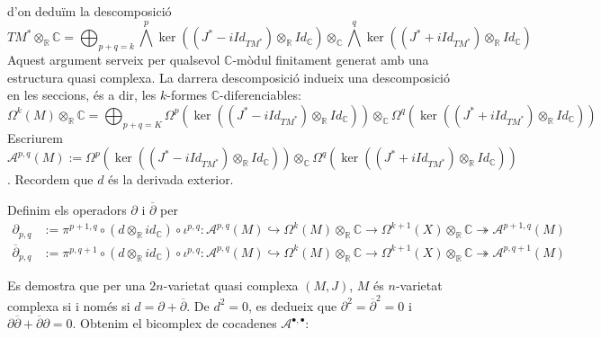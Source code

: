 d'on deduïm la descomposició
\begin{equation*}
    TM^{*}\otimes_{\mathbb{R}}\mathbb{C}
    =\bigoplus_{p+q=k}\bigwedge^{p}\ker((J^{*}-iId_{TM^{*}})\otimes_{\mathbb{R}}Id_{\mathbb{C}})\otimes_{\mathbb{C}}\bigwedge^{q}\ker((J^{*}+iId_{TM^{*}})\otimes_{\mathbb{R}}Id_{\mathbb{C}})
\end{equation*}
Aquest argument serveix per qualsevol $\mathbb{C}$-mòdul finitament generat amb una estructura quasi complexa. La darrera descomposició indueix una descomposició en les seccions, és a dir, les $k$-formes $\mathbb{C}$-diferenciables:
\begin{equation*}
    \Omega^{k}(M)\otimes_{\mathbb{R}}\mathbb{C}
    =\bigoplus_{p+q=K}\Omega^{p}(\ker((J^{*}-iId_{TM^{*}})\otimes_{\mathbb{R}}Id_{\mathbb{C}}))\otimes_{\mathbb{C}}\Omega^{q}(\ker((J^{*}+iId_{TM^{*}})\otimes_{\mathbb{R}}Id_{\mathbb{C}}))
\end{equation*}
Escriurem $\mathcal{A}^{p,q}(M):=\Omega^{p}(\ker((J^{*}-iId_{TM^{*}})\otimes_{\mathbb{R}}Id_{\mathbb{C}}))\otimes_{\mathbb{C}}\Omega^{q}(\ker((J^{*}+iId_{TM^{*}})\otimes_{\mathbb{R}}Id_{\mathbb{C}}))$.\newline
Recordem que $d$ és la derivada exterior.
\begin{definicio}
    Definim els operadors $\partial$ i $\overline{\partial}$ per
    \begin{align*}
        \partial_{p,q}
        &:=\pi^{p+1,q}\circ (d\otimes_{\mathbb{R}}id_{\mathbb{C}})\circ\iota^{p,q}:
        \mathcal{A}^{p,q}(M)
        \hookrightarrow
        \Omega^{k}(M)\otimes_{\mathbb{R}}\mathbb{C}
        \rightarrow
        \Omega^{k+1}(X)\otimes_{\mathbb{R}}\mathbb{C}
        \twoheadrightarrow
        \mathcal{A}^{p+1,q}(M)\\
        \overline{\partial}_{p,q}
        &:=\pi^{p,q+1}\circ (d\otimes_{\mathbb{R}}id_{\mathbb{C}})\circ\iota^{p,q}:
        \mathcal{A}^{p,q}(M)
        \hookrightarrow
        \Omega^{k}(M)\otimes_{\mathbb{R}}\mathbb{C}
        \rightarrow
        \Omega^{k+1}(X)\otimes_{\mathbb{R}}\mathbb{C}
        \twoheadrightarrow
        \mathcal{A}^{p,q+1}(M)
    \end{align*}
\end{definicio}
Es demostra que per una $2n$-varietat quasi complexa $(M,J)$, $M$ és $n$-varietat complexa si i només si $d=\partial+\overline{\partial}$. De $d^{2}=0$, es dedueix que $\partial^{2}=\overline{\partial}^{2}=0$ i $\partial\overline{\partial}+\overline{\partial}\partial=0$. Obtenim el bicomplex de cocadenes $\mathcal{A}^{\bullet,\bullet}$:
